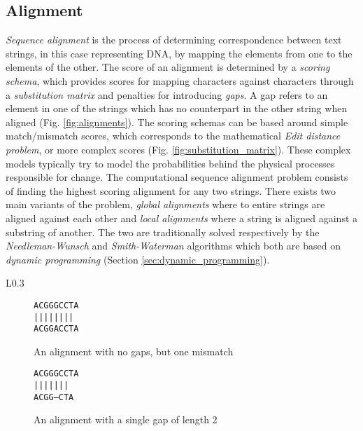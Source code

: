 \documentclass[thesis.tex]{subfiles}
\begin{document}
\subsection{Alignment}
\textit{Sequence alignment} is the process of determining correspondence between text strings, in this case representing DNA, by mapping the elements from one to the elements of the other. The score of an alignment is determined by a \textit{scoring schema}, which provides scores for mapping characters against characters through a \textit{substitution matrix} and penalties for introducing \textit{gaps}. A gap refers to an element in one of the strings which has no counterpart in the other string when aligned (Fig. \ref{fig:alignments}). The scoring schemas can be based around simple match/mismatch scores, which corresponds to the mathematical \textit{Edit distance problem}, or more complex scores (Fig. \ref{fig:substitution_matrix}). These complex models typically try to model the probabilities behind the physical processes responsible for change. The computational sequence alignment problem consists of finding the highest scoring alignment for any two strings. There exists two main variants of the problem, \textit{global alignments} where to entire strings are aligned against each other and \textit{local alignments} where a string is aligned against a substring of another. The two are traditionally solved respectively by the \textit{Needleman-Wunsch} and \textit{Smith-Waterman} algorithms which both are based on \textit{dynamic programming} (Section \ref{sec:dynamic_programming}).
\begin{wrapfigure}{L}{0.3\textwidth}
		\begin{subfigure}[t]{\textwidth}
			\begin{mdframed}
				\begin{center}
					\texttt{ACGGGCCTA}\\
					\texttt{||||\space||||}\\
					\texttt{ACGGACCTA}
				\end{center}
			\end{mdframed}
			\caption{An alignment with no gaps, but one mismatch}
		\end{subfigure}
		\begin{subfigure}[b]{\textwidth}
			\begin{mdframed}
				\begin{center}
					\texttt{ACGGGCCTA}\\
					\texttt{||||\space\space|||}\\
					\texttt{ACGG---CTA}
				\end{center}
			\end{mdframed}
			\caption{An alignment with a single gap of length 2}
		\end{subfigure}
	\caption{Examples of aligned text strings}
	\label{fig:alignments}
\end{wrapfigure}
\end{document}
